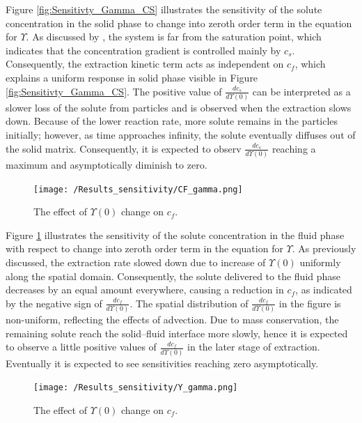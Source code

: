 \documentclass[a4paper,fleqn]{cas-dc}
\begin{document}
	Figure \ref{fig:Sensitivty_Gamma_CS} illustrates the sensitivity of the solute concentration in the solid phase to change into zeroth order term in the equation for $\Upsilon$. As discussed by \citet{Sliczniuk2024}, the system is far from the saturation point, which indicates that the concentration gradient is controlled mainly by $c_s$. Consequently, the extraction kinetic term acts as independent on $c_f$, which explains a uniform response in solid phase visible in Figure \ref{fig:Sensitivty_Gamma_CS}. The positive value of $\frac{dc_s}{d\Upsilon(0)}$ can be interpreted as a slower loss of the solute from particles and is observed when the extraction slows down. Because of the lower reaction rate, more solute remains in the particles initially; however, as time approaches infinity, the solute eventually diffuses out of the solid matrix. Consequently, it is expected to observ $\frac{dc_s}{d\Upsilon(0)}$ reaching a maximum and asymptotically diminish to zero.
	
	\begin{figure}[!ht]
		\centering
		\texttt{[image: /Results\_sensitivity/CF\_gamma.png]}
		\caption{The effect of $\Upsilon(0)$ change on $c_f$.}
		\label{fig:Sensitivty_Gamma_CF}
	\end{figure}
	
	Figure \ref{fig:Sensitivty_Gamma_CF} illustrates the sensitivity of the solute concentration in the fluid phase with respect to change into zeroth order term in the equation for $\Upsilon$. As previously discussed, the extraction rate slowed down due to increase of $\Upsilon(0)$ uniformly along the spatial domain. 
	Consequently, the solute delivered to the fluid phase decreases by an equal amount everywhere, causing a reduction in $c_f$, as indicated by the negative sign of  $\frac{dc_f}{d\Upsilon(0)}$. The spatial distribution of $\frac{dc_f}{d\Upsilon(0)}$ in the figure is non-uniform, reflecting the effects of advection. Due to mass conservation, the remaining solute reach the solid--fluid interface  more slowly, hence it is expected to observe a little positive values of $\frac{dc_f}{d\Upsilon(0)}$ in the later stage of extraction. Eventually it is expected to see sensitivities reaching zero asymptotically.
	
	\begin{figure}[!ht]
		\centering
		\texttt{[image: /Results\_sensitivity/Y\_gamma.png]}
		\caption{The effect of $\Upsilon(0)$ change on $c_f$.}
		\label{fig:Sensitivty_Gamma_Y}
	\end{figure}
	
\end{document}
